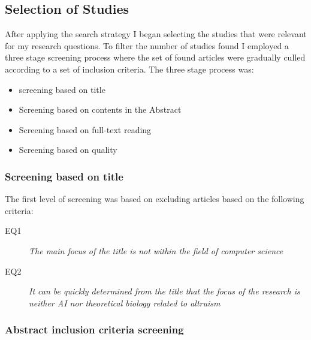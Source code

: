 \documentclass[a4paper]{book}
\begin{document}
\begin{appendices}


				\subsection{Selection of Studies}

				After applying the search strategy I began selecting the studies that were relevant for my research questions. To filter the number of studies found I employed a three stage screening process where the set of found articles were gradually culled according to a set of inclusion criteria. The three stage process was:

				\begin{itemize}

				\item screening based on title
				\item Screening based on contents in the Abstract
				\item Screening based on full-text reading
				\item Screening based on quality

				\end{itemize}

				\subsubsection{Screening based on title}
				The first level of screening was based on excluding articles based on the following criteria:

				\begin{description}
				\item[EQ1] {\it The main focus of the title is not within the field of computer science}
				\item[EQ2] {\it It can be quickly determined from the title that the focus of the research is neither AI nor theoretical biology related to altruism}
				\end{description}


				\subsubsection{Abstract inclusion criteria screening}


\end{appendices}
\end{document}
